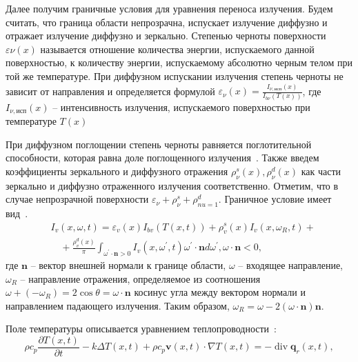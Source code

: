 Далее получим граничные условия для уравнения переноса излучения.
Будем считать, что граница области непрозрачна, испускает излучение диффузно
и отражает излучение диффузно и зеркально.
Степенью черноты поверхности $\varepsilon \nu(x)$ называется отношение количества энергии,
испускаемого данной поверхностью, к количеству энергии, испускаемому абсолютно черным телом при
той же температуре.
При диффузном испускании излучения степень черноты не зависит от направления и определяется формулой
$\varepsilon_\nu(x) = \frac{I_{\nu,\text{исп}}(x)}{I_{b\nu}(T(x))}$, где
$I_{\nu,\text{исп}}(x)$ -- интенсивность излучения, испускаемого
поверхностью при температуре $T(x)$~\cite[53]{Ozisik1976}

При диффузном поглощении степень черноты равняется
поглотительной способности, которая равна доле
поглощенного излучения~\cite[66]{modest2013radiative}.
Также введем коэффициенты зеркального и диффузного отражения
$\rho^s_\nu(x), \rho^d_\nu(x)$ как части зеркально и диффузно отраженного излучения соответственно.
Отметим, что в случае непрозрачной поверхности $\varepsilon_\nu + \rho^s_\nu + \rho^d_{nu = 1}$.
Граничное условие имеет вид~\cite[289]{modest2013radiative}\cite{Kovtanyuk2014a}.
\begin{equation}
    \label{eq:1_1:2}
    \begin{aligned}
        &I_v(x, \omega, t)=\varepsilon_v(x) I_{b v}(T(x, t))
        +\rho_v^s(x) I_v\left(x, \omega_R, t\right)+ \\
        &\quad+\frac{\rho_v^d(x)}{\pi} \int_{\omega^{\prime}
        \cdot \mathbf{n}>0} I_v\left(x, \omega^{\prime},
        t\right) \omega^{\prime} \cdot \mathbf{n} d \omega^{\prime},
        \omega \cdot \mathbf{n} < 0,
    \end{aligned}
\end{equation}
где $\mathbf{n}$ -- вектор внешней нормали к границе области,
$\omega$ -- входящее направление,
$\omega_R$ -- направление отражения, определяемое из соотношения
$\omega + (-\omega_R) = 2 \cos \theta = \omega \cdot \mathbf{n}$
косинус угла между
вектором нормали и направлением падающего излучения.
Таким образом, $\omega_R = \omega -2(\omega \cdot \mathbf{n})\mathbf{n}$.


Поле температуры описывается уравнением теплопроводности~\cite[297]{modest2013radiative}:
\[
    \rho c_p \frac{\partial T(x, t)}{\partial t} - k \Delta T(x, t)+\rho c_p
    \mathbf{v}(x, t) \cdot \nabla T(x, t)=-\operatorname{div} \mathbf{q}_r(x, t),
\]

